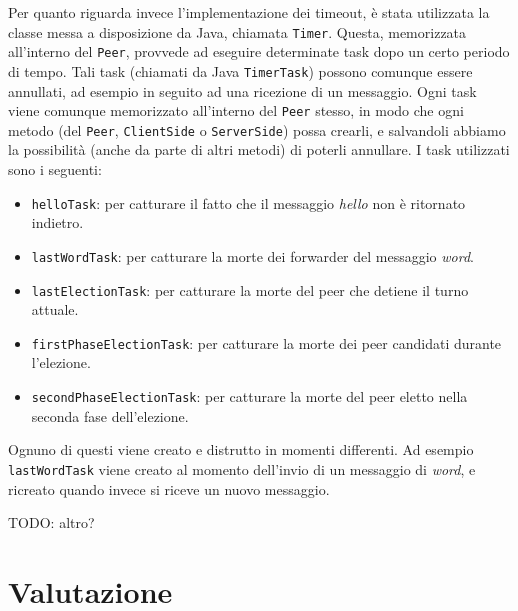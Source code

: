 \documentclass[10.5pt]{article}
\begin{document}
Per quanto riguarda invece l'implementazione dei timeout, è stata utilizzata la classe messa a disposizione da Java, chiamata \texttt{Timer}. Questa, memorizzata all'interno del \texttt{Peer}, provvede ad eseguire determinate task dopo un certo periodo di tempo. Tali task (chiamati da Java \texttt{TimerTask}) possono comunque essere annullati, ad esempio in seguito ad una ricezione di un messaggio. Ogni task viene comunque memorizzato all'interno del \texttt{Peer} stesso, in modo che ogni metodo (del \texttt{Peer}, \texttt{ClientSide} o \texttt{ServerSide}) possa crearli, e salvandoli abbiamo la possibilità (anche da parte di altri metodi) di poterli annullare. I task utilizzati sono i seguenti:

\begin{itemize}
\item \texttt{helloTask}: per catturare il fatto che il messaggio \textit{hello} non è ritornato indietro.
\item \texttt{lastWordTask}: per catturare la morte dei forwarder del messaggio \textit{word}.
\item \texttt{lastElectionTask}: per catturare la morte del peer che detiene il turno attuale.
\item \texttt{firstPhaseElectionTask}: per catturare la morte dei peer candidati durante l'elezione.
\item \texttt{secondPhaseElectionTask}: per catturare la morte del peer eletto nella seconda fase dell'elezione.
\end{itemize}

Ognuno di questi viene creato e distrutto in momenti differenti. Ad esempio \texttt{lastWordTask} viene creato al momento dell'invio di un messaggio di \textit{word}, e ricreato quando invece si riceve un nuovo messaggio.

TODO: altro?

\section{Valutazione}
\end{document}
